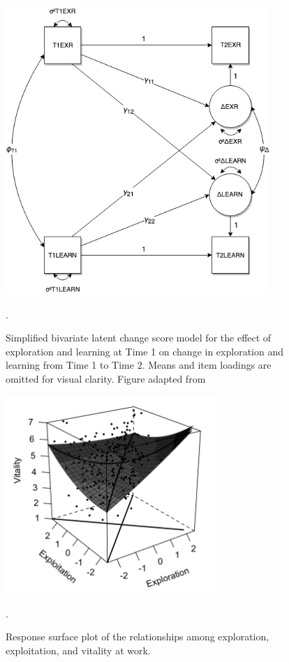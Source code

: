 \documentclass[man, 12pt, a4paper, noextraspace]{apa6}
\begin{document}

\begin{figure}[t]
\includegraphics[width=10cm]{Diagram.png}
\caption{Simplified bivariate latent change score model for the effect of exploration and learning at Time 1 on change in exploration and learning from Time 1 to Time 2. Means and item loadings are omitted for visual clarity. Figure adapted from \textcite{Kievit2018}}.
\end{figure}


\begin{figure}[t]
\includegraphics[width=8cm]{Plot.png}
\caption{Response surface plot of the relationships among exploration, exploitation, and vitality at work.}.
\end{figure}

\printbibliography
\end{document}
